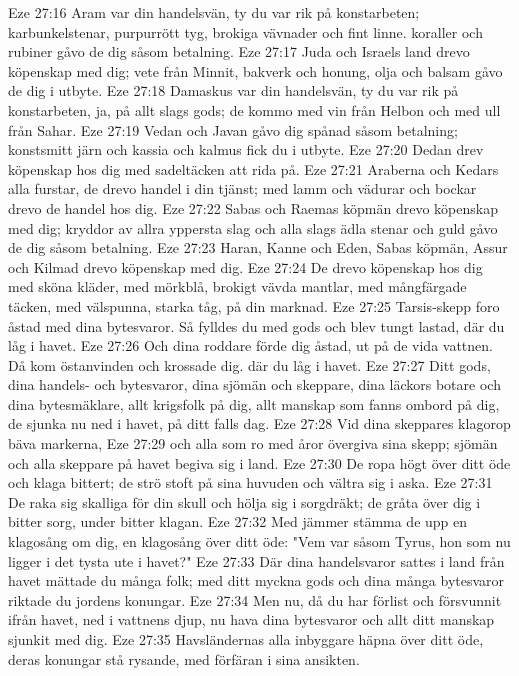Eze 27:16  Aram var din handelsvän, ty du var rik på konstarbeten; karbunkelstenar, purpurrött tyg, brokiga vävnader och fint linne. koraller och rubiner gåvo de dig såsom betalning.
Eze 27:17  Juda och Israels land drevo köpenskap med dig; vete från Minnit, bakverk och honung, olja och balsam gåvo de dig i utbyte.
Eze 27:18  Damaskus var din handelsvän, ty du var rik på konstarbeten, ja, på allt slags gods; de kommo med vin från Helbon och med ull från Sahar.
Eze 27:19  Vedan och Javan gåvo dig spånad såsom betalning; konstsmitt järn och kassia och kalmus fick du i utbyte.
Eze 27:20  Dedan drev köpenskap hos dig med sadeltäcken att rida på.
Eze 27:21  Araberna och Kedars alla furstar, de drevo handel i din tjänst; med lamm och vädurar och bockar drevo de handel hos dig.
Eze 27:22  Sabas och Raemas köpmän drevo köpenskap med dig; kryddor av allra yppersta slag och alla slags ädla stenar och guld gåvo de dig såsom betalning.
Eze 27:23  Haran, Kanne och Eden, Sabas köpmän, Assur och Kilmad drevo köpenskap med dig.
Eze 27:24  De drevo köpenskap hos dig med sköna kläder, med mörkblå, brokigt vävda mantlar, med mångfärgade täcken, med välspunna, starka tåg, på din marknad.
Eze 27:25  Tarsis-skepp foro åstad med dina bytesvaror. Så fylldes du med gods och blev tungt lastad, där du låg i havet.
Eze 27:26  Och dina roddare förde dig åstad, ut på de vida vattnen. Då kom östanvinden och krossade dig. där du låg i havet.
Eze 27:27  Ditt gods, dina handels- och bytesvaror, dina sjömän och skeppare, dina läckors botare och dina bytesmäklare, allt krigsfolk på dig, allt manskap som fanns ombord på dig, de sjunka nu ned i havet, på ditt falls dag.
Eze 27:28  Vid dina skeppares klagorop bäva markerna,
Eze 27:29  och alla som ro med åror övergiva sina skepp; sjömän och alla skeppare på havet begiva sig i land.
Eze 27:30  De ropa högt över ditt öde och klaga bittert; de strö stoft på sina huvuden och vältra sig i aska.
Eze 27:31  De raka sig skalliga för din skull och hölja sig i sorgdräkt; de gråta över dig i bitter sorg, under bitter klagan.
Eze 27:32  Med jämmer stämma de upp en klagosång om dig, en klagosång över ditt öde: "Vem var såsom Tyrus, hon som nu ligger i det tysta ute i havet?"
Eze 27:33  Där dina handelsvaror sattes i land från havet mättade du många folk; med ditt myckna gods och dina många bytesvaror riktade du jordens konungar.
Eze 27:34  Men nu, då du har förlist och försvunnit ifrån havet, ned i vattnens djup, nu hava dina bytesvaror och allt ditt manskap sjunkit med dig.
Eze 27:35  Havsländernas alla inbyggare häpna över ditt öde, deras konungar stå rysande, med förfäran i sina ansikten.
